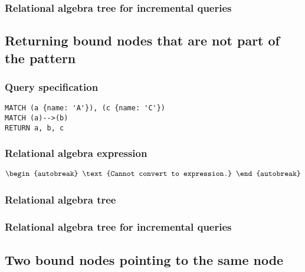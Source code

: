 
\subsubsection*{Relational algebra tree for incremental queries}


\subsection{Returning bound nodes that are not part of the pattern}

\subsubsection*{Query specification}

\begin{lstlisting}
MATCH (a {name: 'A'}), (c {name: 'C'})
MATCH (a)-->(b)
RETURN a, b, c
\end{lstlisting}

\subsubsection*{Relational algebra expression}

\begin{align*}
\begin{autobreak}
\text{Cannot convert to expression.}
\end{autobreak}
\end{align*}

\subsubsection*{Relational algebra tree}


\subsubsection*{Relational algebra tree for incremental queries}


\subsection{Two bound nodes pointing to the same node}

